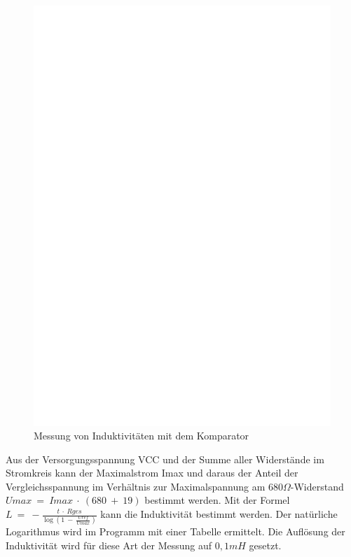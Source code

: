 \begin{figure}[H]
\centering
\includegraphics[]{../FIG/Inductance.eps}
\caption{Messung von Induktivitäten mit dem Komparator}
\label{fig:Inductance}
\end{figure}

Aus der Versorgungsspannung VCC und der Summe aller Widerstände im Stromkreis kann der Maximalstrom Imax und
daraus der Anteil der Vergleichsspannung im Verhältnis zur Maximalspannung am \(680\Omega\)-Widerstand
\(Umax~=~Imax~\cdot~(680~+~19)\) bestimmt werden.
Mit der Formel \(L~=~-\frac{t~\cdot~Rges}{\log{(1~-~\frac{Uref}{Umax})}}\) kann die Induktivität bestimmt werden.
Der natürliche Logarithmus wird im Programm mit einer Tabelle ermittelt.
Die Auflösung der Induktivität wird für diese Art der Messung auf \(0,1mH\) gesetzt.

